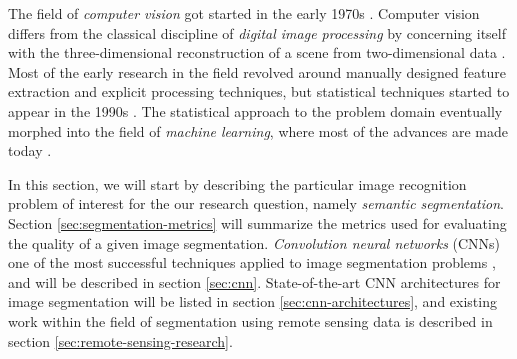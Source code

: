The field of \textit{computer vision} got started in the early 1970s \cite[p.~10]{computer_vision_history}.
Computer vision differs from the classical discipline of \textit{digital image processing} by concerning itself with the three-dimensional reconstruction of a scene from two-dimensional data \cite[p.~10]{computer_vision_history}.
Most of the early research in the field revolved around manually designed feature extraction and explicit processing techniques, but statistical techniques started to appear in the 1990s \cite[p.~15]{computer_vision_history}.
The statistical approach to the problem domain eventually morphed into the field of \textit{machine learning}, where most of the advances are made today \cite[p.~17]{computer_vision_history}.

In this section, we will start by describing the particular image recognition problem of interest for the our research question, namely \textit{semantic segmentation}.
Section \ref{sec:segmentation-metrics} will summarize the metrics used for evaluating the quality of a given image segmentation.
\textit{Convolution neural networks} (CNNs)  one of the most successful techniques applied to image segmentation problems \cite[p.~1]{image_recognition}, and will be described in section \ref{sec:cnn}.
State-of-the-art CNN architectures for image segmentation will be listed in section \ref{sec:cnn-architectures}, and existing work within the field of segmentation using remote sensing data is described in section \ref{sec:remote-sensing-research}.
